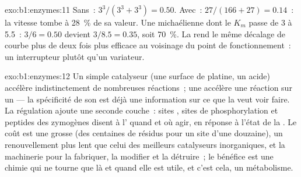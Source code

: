 \begin{solution}{exo:b1:enzymes:11}
Sans~: $3^3/(3^3 + 3^3) = 0.50$. Avec~: $27/(166 + 27) = 0.14$~: la
vitesse tombe à \qty{28}{\%} de sa valeur. Une  michaélienne dont
le $K_m$ passe de 3 à 5.5~: $3/6 = 0.50$ devient $3/8.5 = 0.35$, soit
\qty{70}{\%}. La  rend le même décalage de courbe plus de
deux fois plus efficace au voisinage du point de fonctionnement~: un
interrupteur plutôt qu'un variateur.
\end{solution}

\begin{solution}{exo:b1:enzymes:12}
Un simple catalyseur (une surface de platine, un acide) accélère
indistinctement de nombreuses réactions~; une  accélère une
réaction sur un  --- la spécificité de son  est déjà
une information sur ce que la  veut voir faire. La régulation
ajoute une seconde couche~: sites , sites de
phosphorylation et peptides des zymogènes disent à l' quand et où
agir, en réponse à l'état de la . Le coût est une grosse 
(des centaines de résidus pour un site d'une douzaine), un
renouvellement plus lent que celui des meilleurs catalyseurs
inorganiques, et la machinerie pour la fabriquer, la modifier et la
détruire~; le bénéfice est une chimie qui ne tourne que là et quand elle
est utile, et c'est cela, un métabolisme.
\end{solution}


